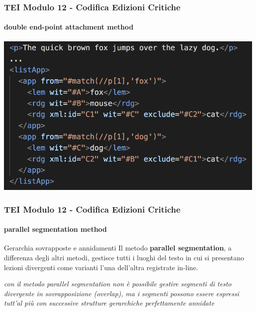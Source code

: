\begin{frame}
    \frametitle{TEI Modulo 12 - Codifica Edizioni Critiche}
    \framesubtitle{double end-point attachment method}
    \addtocounter{nframe}{1}
    
   
    \begin{center}
       \includegraphics[width=.95\textwidth]{imgs/indirected-standoff-app.png}
    \end{center}

\end{frame}




\begin{frame}
    \frametitle{TEI Modulo 12 - Codifica Edizioni Critiche}
    \framesubtitle{parallel segmentation method}
    \addtocounter{nframe}{1}
    






    \begin{block}{Gerarchia sovrapposte e annidamenti}
      Il metodo \textbf{parallel segmentation}, a differenza degli altri metodi, gestisce tutti i luoghi del testo in cui si presentano lezioni divergenti come varianti l'una dell'altra registrate in-line.
    \end{block}

    \textit{con il metodo parallel segmentation non è possibile gestire segmenti di testo divergente in sovrapposizione (overlap), ma i segmenti possono essere espressi tutt'al più con successive strutture gerarchiche perfettamente annidate}

\end{frame}

